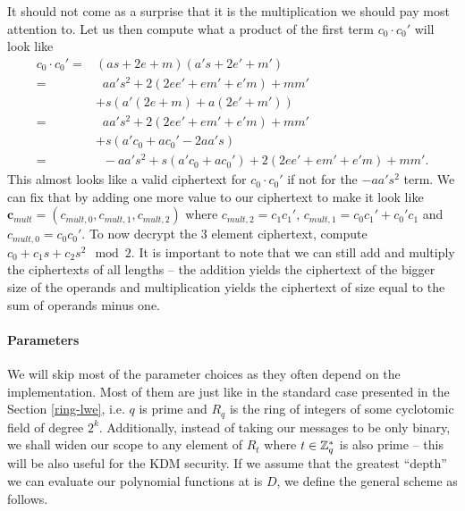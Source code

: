 It should not come as a surprise that it is the multiplication we should pay most attention to. Let us then compute what a product of the first term $c_0 \cdot c_0'$ will look like
\begin{align*}
	c_0 \cdot c_0' = & (as +2e+m)(a's+2e'+m')\\
	= & \; \; aa's^2 + 2(2ee'+em'+e'm) +mm' \\
	  & + s(a'(2e+m) + a(2e'+m')) \\
	= & \; \; aa's^2 + 2(2ee'+em'+e'm) +mm' \\
	  & + s(a'c_0+ac_0' - 2aa's) \\
	= & \; \; -aa's^2 + s(a'c_0 + ac_0') + 2(2ee'+em'+e'm) +mm'.
\end{align*}
This almost looks like a valid ciphertext for $c_0 \cdot c_0'$ if not for the $-aa's^2$ term. We can fix that by adding one more value to our ciphertext to make it look like $\bm{c}_{mult} = (c_{mult, 0}, c_{mult, 1}, c_{mult, 2})$ where $c_{mult, 2} = c_1c_1'$, $c_{mult, 1} = c_0c_1' + c_0'c_1$ and $c_{mult, 0} = c_0c_0'$. To now decrypt the 3 element ciphertext, compute $c_0 + c_1s +c_2s^2 \mod 2$. It is important to note that we can still add and multiply the ciphertexts of all lengths -- the addition yields the ciphertext of the bigger size of the operands and multiplication yields the ciphertext of size equal to the sum of operands minus one. 

\paragraph{Parameters}
We will skip most of the parameter choices as they often depend on the implementation. Most of them are just like in the standard case presented in the Section \ref{ring-lwe}, i.e. $q$ is prime and $R_q$ is the ring of integers of some cyclotomic field of degree $2^k$. Additionally, instead of taking our messages to be only binary, we shall widen our scope to any element of $R_t$ where $t \in \mathbb{Z}_q^*$ is also prime -- this will be also useful for the KDM security. If we assume that the greatest ``depth'' we can evaluate our polynomial functions at is $D$, we define the general scheme as follows.


